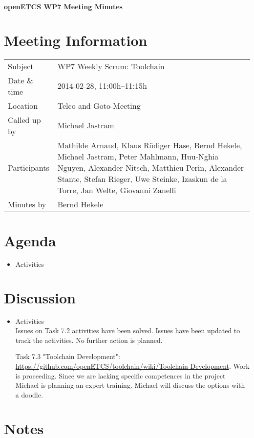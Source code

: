 \documentclass[a4paper, 11pt]{article}
\begin{document}
{\begin{center}\huge\bf openETCS WP7 Meeting Minutes\end{center}}
\section{Meeting Information}

\renewcommand{\arraystretch}{1.5}
\begin{supertabular}{m{.2\textwidth}m{.8\textwidth}}
Subject & WP7 Weekly Scrum: Toolchain\\
Date \& time & 2014-02-28, 11:00h--11:15h\\
Location & Telco and Goto-Meeting\\
Called up by & Michael Jastram\\
Participants &
Mathilde Arnaud,
Klaus R\"udiger Hase,
Bernd Hekele,
Michael Jastram,
Peter Mahlmann,
Huu-Nghia Nguyen,
Alexander Nitsch,
Matthieu Perin,
Alexander Stante,
Stefan Rieger,
Uwe Steinke,
Izaskun de la Torre,
Jan Welte,
Giovanni Zanelli
\\

Minutes by & Bernd Hekele\\

\end{supertabular}
\renewcommand{\arraystretch}{1.0}


\section{Agenda}
\begin{itemize}
\item Activities
\end{itemize}

\section{Discussion}

\begin{itemize}
\item Activities\\
Issues on Task 7.2 activities have been solved. Issues have been updated to track the activities. No further action is planned.

Task 7.3 "Toolchain Development": \url{https://github.com/openETCS/toolchain/wiki/Toolchain-Development}.
Work is proceeding. Since we are lacking specific competences in the project Michael is planning an expert training. Michael will discuss the options with a doodle.

\end{itemize}

\section{Notes}
\end{document}
